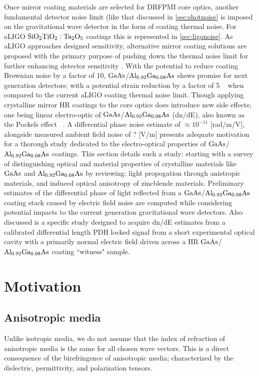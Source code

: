 
Once mirror coating materials are selected for DRFPMI core optics, another fundamental detector noise limit (like that discussed in \autoref{sec:shotnoise} is imposed on the gravitational wave detector in the form of coating thermal noise. For aLIGO $\mathrm{SiO_2}\mathrm{TiO_2:Ta_2O_5}$ coatings this is represented in \autoref{sec:ligonoise}. As aLIGO approaches designed sensitivity, alternative mirror coating solutions are proposed with the primary purpose of pushing down the thermal noise limit for further enhancing detector sensitivity \cite{harry:aigwd2019}. With the potential to reduce coating Brownian noise by a factor of 10, $\mathrm{GaAs}$/$\mathrm{Al_{0.92}Ga_{0.08}As}$ shows promise for next generation detectors; with a potential strain reduction by a factor of 5 ~\cite{cole:2013} when compared to the current aLIGO coating thermal noise limit. Though applying crystalline mirror HR coatings to the core optics does introduce new side effects; one being linear electro-optic of $\mathrm{GaAs}$/$\mathrm{Al_{0.92}Ga_{0.08}As}$ (dn/dE), also known as the Pockels effect ~\cite{abernathy:poster}. A differential phase noise estimate of $\approx 10^{-11}$ [rad/m/V], alongside measured ambient field noise of ? [V/m] presents adequate motivation for a thorough study dedicated to the electro-optical properties of $\mathrm{GaAs}$/$\mathrm{Al_{0.92}Ga_{0.08}As}$ coatings. This section details such a study: starting with a survey of distinguishing optical and material properties of crystalline materials like $\mathrm{GaAs}$ and $\mathrm{Al_{0.92}Ga_{0.08}As}$ by reviewing: light propogation through anistropic materials, and induced optical anisotropy of zincblende materials. Preliminary estimates of the differential phase of light reflected from a $\mathrm{GaAs}$/$\mathrm{Al_{0.92}Ga_{0.08}As}$ coating stack caused by electric field noise are computed while considering potential impacts to the current generation gravitational wave detectors. Also discussed is a specific study designed to acquire dn/dE estimates from a calibrated differential length PDH locked signal from a short experimental optical cavity with a primarily normal electric field driven across a HR $\mathrm{GaAs}$/$\mathrm{Al_{0.92}Ga_{0.08}As}$ coating ``witness" sample.


\section{Motivation}
\subsection{Anisotropic media}
Unlike isotropic media, we do not assume that the index of refraction of anisotropic media is the same for all chosen wave vectors. This is a direct consequence of the birefringence of anisotropic media; characterized by the dielectric, permittivity, and polarization tensors.

